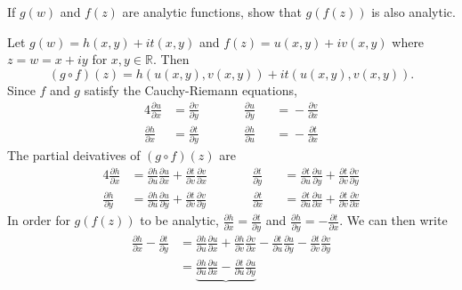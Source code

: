 \begin{exercise}
\item
  If \(g(w)\) and \(f(z)\) are analytic functions, show that \(g(f(z))\) is
  also analytic.
  \par\smallskip
  Let \(g(w) = h(x,y) + it(x,y)\) and \(f(z) = u(x,y) + iv(x,y)\) where
  \(z = w = x + iy\) for \(x,y\in\mathbb{R}\).
  Then
  \[
  (g\circ f)(z) = h(u(x, y), v(x, y)) + it(u(x, y), v(x, y)).
  \]
  Since \(f\) and \(g\) satisfy the Cauchy-Riemann equations,
  \begin{alignat*}{4}
    \frac{\partial u}{\partial x} & = \frac{\partial v}{\partial y} & \qquad &
    \frac{\partial u}{\partial y} && ={} -\frac{\partial v}{\partial x}\\
    \frac{\partial h}{\partial x} & = \frac{\partial t}{\partial y} & \qquad &
    \frac{\partial h}{\partial u} && ={} -\frac{\partial t}{\partial x}
  \end{alignat*}
  The partial deivatives of \((g\circ f)(z)\) are
  \begin{alignat*}{4}
    \frac{\partial h}{\partial x}
    & = \frac{\partial h}{\partial u}\frac{\partial u}{\partial x} +
    \frac{\partial t}{\partial v}\frac{\partial v}{\partial x} & \qquad &
    \frac{\partial t}{\partial y}
    && ={} \frac{\partial t}{\partial u}\frac{\partial u}{\partial y} +
    \frac{\partial t}{\partial v}\frac{\partial v}{\partial y}\\
    \frac{\partial h}{\partial y}
    & = \frac{\partial h}{\partial u}\frac{\partial u}{\partial y} +
    \frac{\partial t}{\partial v}\frac{\partial v}{\partial y} & \qquad &
    \frac{\partial t}{\partial x}
    && ={} \frac{\partial t}{\partial u}\frac{\partial u}{\partial x} +
    \frac{\partial t}{\partial v}\frac{\partial v}{\partial x}
  \end{alignat*}
  In order for \(g(f(z))\) to be analytic,
  \(\frac{\partial h}{\partial x} = \frac{\partial t}{\partial y}\) and
  \(\frac{\partial h}{\partial y} = -\frac{\partial t}{\partial x}\).
  We can then write
  \begin{align*}
    \frac{\partial h}{\partial x} - \frac{\partial t}{\partial y}
    & = \frac{\partial h}{\partial u}\frac{\partial u}{\partial x} +
      \frac{\partial h}{\partial v}\frac{\partial v}{\partial x} -
      \frac{\partial t}{\partial u}\frac{\partial u}{\partial y} -
      \frac{\partial t}{\partial v}\frac{\partial v}{\partial y}\\
    & = \underbrace{\frac{\partial h}{\partial u}\frac{\partial u}{\partial x}
      - \frac{\partial t}{\partial u}\frac{\partial u}{\partial y}}_{
}
\end{align*}
\end{exercise}
